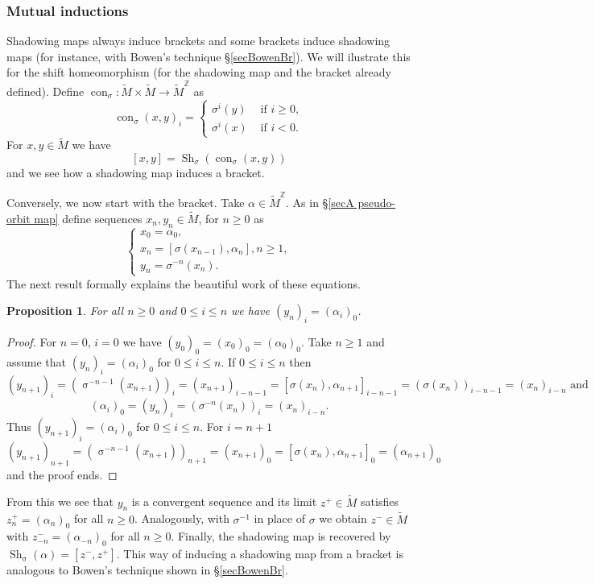 \documentclass[12pt]{amsart}
\DeclareMathOperator{\shift}{\sigma}
\theoremstyle{plain}
\newtheorem{prop}[thm]{Proposition}
\theoremstyle{definition}
\theoremstyle{remark}
\DeclareMathOperator{\con}{con}
\DeclareMathOperator{\shm}{Sh}
\newcommand{\Z}{\mathbb Z}
\newcommand{\tM}{\tilde{M}}
\begin{document}
\subsubsection{Mutual inductions}
Shadowing maps always induce brackets and some brackets induce shadowing maps (for instance, with Bowen's technique \S \ref{secBowenBr}).
We will ilustrate this for the shift homeomorphism (for the shadowing map and the bracket already defined).
Define $\con_{\sigma}\colon \tM\times\tM\to\tM^\Z$ as
\[
	\con_\sigma(x,y)_i=
	\left\{
	\begin{array}{ll}
		\sigma^i(y)	& \text{ if }i\geq 0,\\
		\sigma^i(x)	& \text{ if }i<0.
	\end{array}
	\right.
\]
For $x,y\in\tM$ we have
$$
	[x,y]=\shm_\sigma(\con_\sigma(x,y))
$$
and we see how a shadowing map induces a bracket.

Conversely, we now start with the bracket.
Take $\alpha\in\tM^\Z$.
As in \S\ref{secA pseudo-orbit map} define sequences $x_n,y_n\in\tM$, for $n\geq 0$ as
\[
	\left\{
	\begin{array}{l}
		x_0=\alpha_0,\\
		x_n=[\sigma(x_{n-1}),\alpha_n], n\geq 1,\\
		y_n=\sigma^{-n}(x_n).
	\end{array}
	\right.
\]
The next result formally explains the beautiful work of these equations.

\begin{prop}
	For all $n\geq 0$ and $0\leq i\leq n$ we have
	$(y_n)_i=(\alpha_i)_0$.
\end{prop}

\begin{proof}
For $n=0$, $i=0$ we have $(y_0)_0=(x_0)_0=(\alpha_0)_0$.
Take $n\geq 1$ and assume that
$(y_n)_i=(\alpha_i)_0$ for $0\leq i\leq n$.
If $0\leq i\leq n$ then
\[
(y_{n+1})_i=(\shift^{-n-1}(x_{n+1}))_i=
(x_{n+1})_{i-n-1}=
[\sigma(x_{n}),\alpha_{n+1}]_{i-n-1}=
(\sigma(x_{n}))_{i-n-1}=
(x_{n})_{i-n}\text{ and }
\]
\[
	(\alpha_i)_0=(y_n)_i=
	(\sigma^{-n}(x_n))_i=
	(x_n)_{i-n}.
\]
Thus $(y_{n+1})_i=(\alpha_i)_0$ for $0\leq i\leq n$.
For $i=n+1$
\[
(y_{n+1})_{n+1}=
(\shift^{-n-1}(x_{n+1}))_{n+1}=
(x_{n+1})_{0}=
[\sigma(x_{n}),\alpha_{n+1}]_{0}=(\alpha_{n+1})_{0}
\]
and the proof ends.
\end{proof}

From this we see that $y_n$ is a convergent sequence and its limit $z^+\in\tM$ satisfies $z^+_n=(\alpha_n)_0$ for all $n\geq 0$.
Analogously, with $\sigma^{-1}$ in place of $\sigma$ we obtain $z^-\in\tM$
with $z^-_{-n}=(\alpha_{-n})_0$ for all $n\geq 0$.
Finally, the shadowing map is recovered by
$\shm_{\shift}(\alpha)=[z^-,z^+]$.
This way of inducing a shadowing map from a bracket is analogous to Bowen's technique shown in \S\ref{secBowenBr}.
\end{document}
